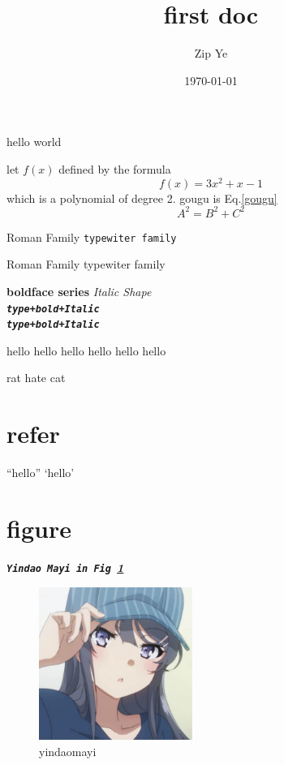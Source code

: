 \documentclass[12pt]{article} %
\title{first doc}
\author{Zip Ye}
\date{\today}
\newcommand{\xixi}{^2}
\newcommand{\myfont}[1]{\texttt{\textbf{\textit{#1}}}}
\newcommand{\hate}[2]{#1 hate #2}  %
\begin{document}
    \maketitle
    hello world

    let $f(x)$ defined by the formula $$f(x)=3x^2+x-1$$ which is a polynomial
    of degree 2. gougu is Eq.\ref{gougu}
    \begin{equation}
        A\xixi=B\xixi+C\xixi \label{gougu}
    \end{equation}

    \textrm{Roman Family} \texttt{typewiter family}

    {\rmfamily Roman Family} {\ttfamily typewiter family}

    \textbf{boldface series} \textit{Italic Shape}\\
    \texttt{\textbf{\textit{type+bold+Italic}}}\\
    \myfont{type+bold+Italic}

    {\tiny hello\cite{b2}}
    {\scriptsize hello}
    {\small hello}
    {\normalsize hello}
    {\large hello}
    {\huge hello\cite{b1}}

    \hate{rat}{cat}
    \section{refer}
    ``hello'' `hello'
    \section{figure}
    \myfont{Yindao Mayi in Fig \ref{Fig.1}}
    \begin{figure}[H]
        \vspace{0.cm}
        \centering
        \includegraphics[width=5cm,
                        height=5cm]{timg.jpeg}
        \setlength{\abovecaptionskip}{0.cm}
        \setlength{\belowcaptionskip}{0.cm}
        \caption{\small yindaomayi}\label{Fig.1}
    \end{figure}
\end{document}

